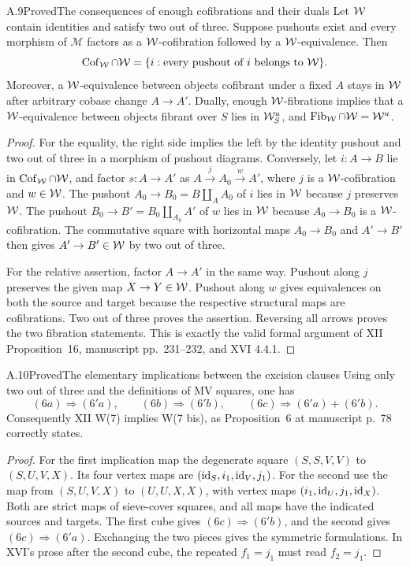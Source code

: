 \begin{claim}{A.9}{Proved}{The consequences of enough cofibrations and their duals}
Let $\mathcal{W}$ contain identities and satisfy two out of three. Suppose pushouts exist and every morphism of $\mathcal M$ factors as a $\mathcal{W}$-cofibration followed by a $\mathcal{W}$-equivalence. Then
\[
\operatorname{Cof}_{\mathcal{W}}\cap\mathcal{W}
=\{i:\text{every pushout of }i\text{ belongs to }\mathcal{W}\}.
\]
Moreover, a $\mathcal{W}$-equivalence between objects cofibrant under a fixed $A$ stays in $\mathcal{W}$ after arbitrary cobase change $A\to A'$. Dually, enough $\mathcal{W}$-fibrations implies that a $\mathcal{W}$-equivalence between objects fibrant over $S$ lies in $\mathcal{W}_S^u$, and $\operatorname{Fib}_{\mathcal{W}}\cap\mathcal{W}=\mathcal{W}^u$.
\end{claim}
\begin{proof}
For the equality, the right side implies the left by the identity pushout and two out of three in a morphism of pushout diagrams. Conversely, let $i:A\to B$ lie in $\operatorname{Cof}_{\mathcal{W}}\cap\mathcal{W}$, and factor $s:A\to A'$ as $A\xrightarrow{j}A_0\xrightarrow{w}A'$, where $j$ is a $\mathcal{W}$-cofibration and $w\in\mathcal{W}$. The pushout $A_0\to B_0=B\amalg_A A_0$ of $i$ lies in $\mathcal{W}$ because $j$ preserves $\mathcal{W}$. The pushout $B_0\to B'=B_0\amalg_{A_0}A'$ of $w$ lies in $\mathcal{W}$ because $A_0\to B_0$ is a $\mathcal{W}$-cofibration. The commutative square with horizontal maps $A_0\to B_0$ and $A'\to B'$ then gives $A'\to B'\in\mathcal{W}$ by two out of three.

For the relative assertion, factor $A\to A'$ in the same way. Pushout along $j$ preserves the given map $X\to Y\in\mathcal{W}$. Pushout along $w$ gives equivalences on both the source and target because the respective structural maps are cofibrations. Two out of three proves the assertion. Reversing all arrows proves the two fibration statements. This is exactly the valid formal argument of XII Proposition~16, manuscript pp.~231--232, and XVI 4.4.1.
\end{proof}

\begin{claim}{A.10}{Proved}{The elementary implications between the excision clauses}
Using only two out of three and the definitions of MV squares, one has
\[
(6a)\Rightarrow(6'a),\qquad
(6b)\Rightarrow(6'b),\qquad
(6c)\Rightarrow(6'a)+(6'b).
\]
Consequently XII W(7) implies W(7 bis), as Proposition~6 at manuscript p.~78 correctly states.
\end{claim}
\begin{proof}
For the first implication map the degenerate square $(S,S,V,V)$ to $(S,U,V,X)$. Its four vertex maps are $(\mathrm{id}_S,i_1,\mathrm{id}_V,j_1)$. For the second use the map from $(S,U,V,X)$ to $(U,U,X,X)$, with vertex maps $(i_1,\mathrm{id}_U,j_1,\mathrm{id}_X)$. Both are strict maps of sieve-cover squares, and all maps have the indicated sources and targets. The first cube gives $(6c)\Rightarrow(6'b)$, and the second gives $(6c)\Rightarrow(6'a)$. Exchanging the two pieces gives the symmetric formulations. In XVI's prose after the second cube, the repeated $f_1=j_1$ must read $f_2=j_1$.
\end{proof}

